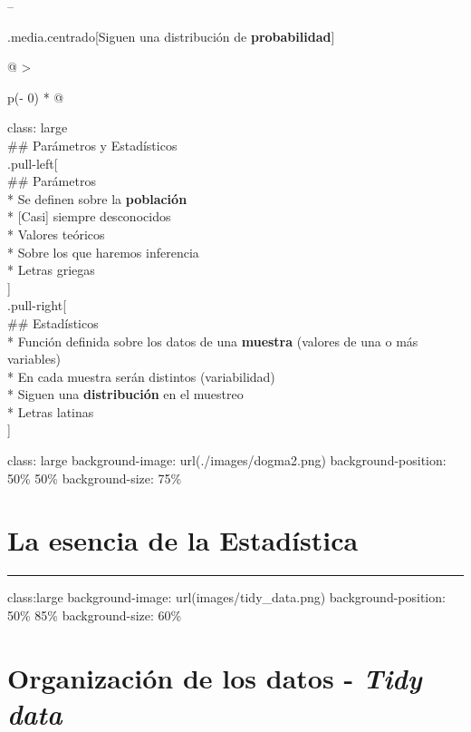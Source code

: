 \documentclass[
]{book}
\begin{document}
--

.media.centrado{[}Siguen una distribución de \textbf{probabilidad}{]}

\begin{longtable}[]{@{}
  >{\raggedright\arraybackslash}p{(\columnwidth - 0\tabcolsep) * }@{}}
\toprule
\endhead
class: large \\
\#\# Parámetros y Estadísticos \\
.pull-left{[} \\
\#\# Parámetros \\
* Se definen sobre la \textbf{población} \\
* {[}Casi{]} siempre desconocidos \\
* Valores teóricos \\
* Sobre los que haremos inferencia \\
* Letras griegas \\
{]} \\
.pull-right{[} \\
\#\# Estadísticos \\
* Función definida sobre los datos de una \textbf{muestra} (valores de una o más variables) \\
* En cada muestra serán distintos (variabilidad) \\
* Siguen una \textbf{distribución} en el muestreo \\
* Letras latinas \\
{]} \\
\bottomrule
\end{longtable}

class: large
background-image: url(./images/dogma2.png)
background-position: 50\% 50\%
background-size: 75\%

\hypertarget{la-esencia-de-la-estaduxedstica-1}{%
\section{La esencia de la Estadística}\label{la-esencia-de-la-estaduxedstica-1}}

\begin{center}\rule{0.5\linewidth}{0.5pt}\end{center}

class:large
background-image: url(images/tidy\_data.png)
background-position: 50\% 85\%
background-size: 60\%

\hypertarget{organizaciuxf3n-de-los-datos---tidy-data}{%
\section{\texorpdfstring{Organización de los datos - \emph{Tidy data}}{Organización de los datos - Tidy data}}\label{organizaciuxf3n-de-los-datos---tidy-data}}
\end{document}
